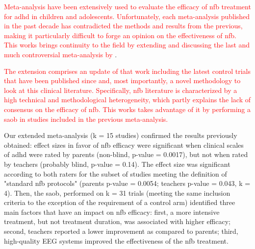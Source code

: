

\textcolor{red}{\noindent Meta-analysis have been extensively used to
evaluate the efficacy of \gls{nfb} treatment for \gls{adhd} in children and adolescents. 
Unfortunately, each meta-analysis published in the past decade has contradicted the methods and
results from the previous, making it particularly difficult to forge an opinion
on the effectiveness of \gls{nfb}. This works brings continuity to the field by extending and discussing the last and much 
controversial meta-analysis by} \citet{Cortese2016}. 


\textcolor{red}{The extension comprises an update of that work including the latest control trials 
that have been published since and, most importantly, a
novel methodology to look at this clinical literature. Specifically, \gls{nfb} literature is characterized 
by a high technical and methodological heterogeneity, which partly explains the lack of consensus on 
the efficacy of \gls{nfb}. This works takes advantage of it by performing a \gls{saob} in studies included in the previous meta-analysis.}

Our extended meta-analysis (k = 15 studies) confirmed the results previously
obtained: effect sizes in favor of \gls{nfb} efficacy were significant when clinical scales of \gls{adhd}
were rated by parents (non-blind, p-value = 0.0017), but not when rated by
teachers (probably blind, p-value = 0.14). The effect size was significant
according to both raters for the subset of studies meeting the definition of
"standard \gls{nfb} protocols" (parents p-value = 0.0054; teachers p-value = 0.043, k
= 4). Then, the \gls{saob}, performed on k = 31 trials (meeting the same inclusion
criteria to the exception of the requirement of a control arm)
identified three main factors that have an impact on \gls{nfb} efficacy: first, a more
intensive treatment, but not treatment duration, was associated with higher
efficacy; second, teachers reported a lower improvement as compared to parents;
third, high-quality EEG systems improved the effectiveness of the \gls{nfb} treatment.


